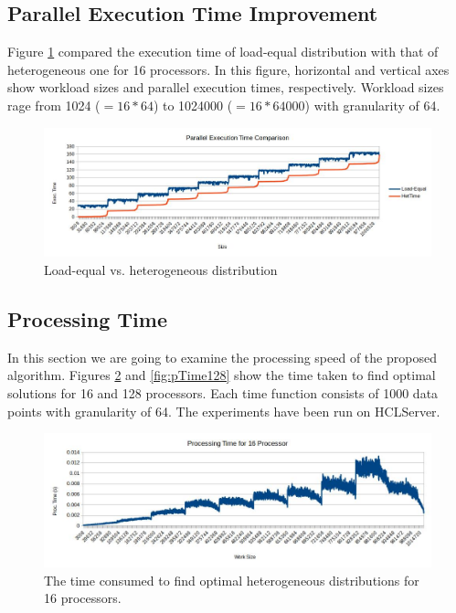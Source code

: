 \documentclass[12pt]{article}
\begin{document}
\subsection{Parallel Execution Time Improvement}
Figure \ref{fig:etimeComp} compared the execution time of load-equal distribution with that of heterogeneous one for 16 processors. In this figure, horizontal and vertical axes show workload sizes and parallel execution times, respectively. Workload sizes rage from 1024 ($=16*64$) to 1024000 ($=16*64000$) with granularity of 64.

\begin{figure}[!t]
\centering
\includegraphics[width=6in]{Images/eTimeCompare_set16.jpg}
\caption{Load-equal vs. heterogeneous distribution}
\label{fig:etimeComp}
\end{figure}

\subsection{Processing Time}
In this section we are going to examine the processing speed of the proposed algorithm. Figures \ref{fig:pTime16} and \ref{fig:pTime128} show the time taken to find optimal solutions for 16 and 128 processors. Each time function consists of 1000 data points with granularity of 64. The experiments have been run on HCLServer.

\begin{figure}[!t]
\centering
\includegraphics[width=6in]{Images/procTime_set16.jpg}
\caption{The time consumed to find optimal heterogeneous distributions for 16 processors.}
\label{fig:pTime16}
\end{figure}
\end{document}
